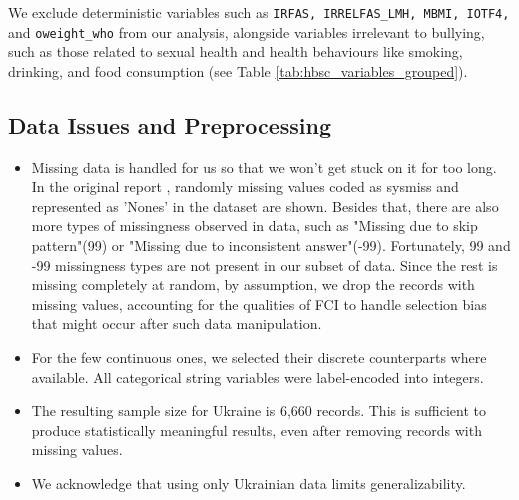 \documentclass[main.tex]{subfiles}
\begin{document}
We exclude deterministic variables such as \texttt{IRFAS, IRRELFAS\_LMH, MBMI, IOTF4,} and \texttt{oweight\_who} from our analysis, alongside variables irrelevant to bullying, such as those related to sexual health and health behaviours like smoking, drinking, and food consumption (see Table \ref{tab:hbsc_variables_grouped}).


% 

% 



% 

\subsection{Data Issues and Preprocessing}
\begin{itemize}
  \item   Missing data is handled for us so that we won't get stuck on it for too long. In the original report \cite{HBSC2018OA_ed1}, randomly missing values coded as sysmiss and represented as 'Nones' in the dataset are shown. Besides that, there are also more types of missingness observed in data, such as "Missing due to skip pattern"(99) or "Missing due to inconsistent answer"(-99). Fortunately, 99 and -99 missingness types are not present in our subset of data. Since the rest is missing completely at random, by assumption, we drop the records with missing values, accounting for the qualities of FCI to handle selection bias\cite{ZHANG20081873} that might occur after such data manipulation. 
  \item For the few continuous ones, we selected their discrete counterparts where available. All categorical string variables were label-encoded into integers. 
  \item  The resulting sample size for Ukraine is 6,660 records. This is sufficient to produce statistically meaningful results, even after removing records with missing values. 
  \item We acknowledge that using only Ukrainian data limits generalizability.
\end{itemize}


\end{document}
